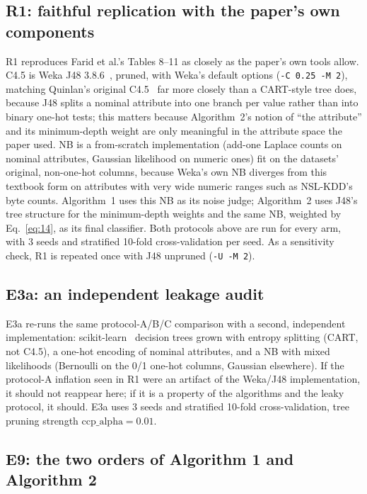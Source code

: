 \subsection{R1: faithful replication with the paper's own components}

R1 reproduces Farid et al.'s Tables 8--11 as closely as the paper's own
tools allow. C4.5 is Weka J48 3.8.6~\cite{witten2016weka}, pruned, with
Weka's default options (\texttt{-C 0.25 -M 2}), matching Quinlan's original
C4.5~\cite{quinlan1993c45} far more closely than a CART-style tree does,
because J48 splits a nominal attribute into one branch per value rather
than into binary one-hot tests; this matters because Algorithm~2's notion
of ``the attribute'' and its minimum-depth weight are only meaningful in
the attribute space the paper used. NB is a from-scratch implementation
(add-one Laplace counts on nominal attributes, Gaussian likelihood on
numeric ones) fit on the datasets' original, non-one-hot columns, because
Weka's own NB diverges from this textbook form on attributes with very
wide numeric ranges such as NSL-KDD's byte counts. Algorithm~1 uses this
NB as its noise judge; Algorithm~2 uses J48's tree structure for the
minimum-depth weights and the same NB, weighted by Eq.~\eqref{eq:14}, as
its final classifier. Both protocols above are run for every arm, with 3
seeds and stratified 10-fold cross-validation per seed. As a sensitivity
check, R1 is repeated once with J48 unpruned (\texttt{-U -M 2}).

\subsection{E3a: an independent leakage audit}

E3a re-runs the same protocol-A/B/C comparison with a second, independent
implementation: scikit-learn~\cite{pedregosa2011scikit} decision trees
grown with entropy splitting (CART, not C4.5), a one-hot encoding of
nominal attributes, and a NB with mixed likelihoods (Bernoulli on the
0/1 one-hot columns, Gaussian elsewhere). If the protocol-A inflation seen
in R1 were an artifact of the Weka/J48 implementation, it should not
reappear here; if it is a property of the algorithms and the leaky
protocol, it should. E3a uses 3 seeds and stratified 10-fold
cross-validation, tree pruning strength $\mathrm{ccp\_alpha}=0.01$.

\subsection{E9: the two orders of Algorithm 1 and Algorithm 2}


